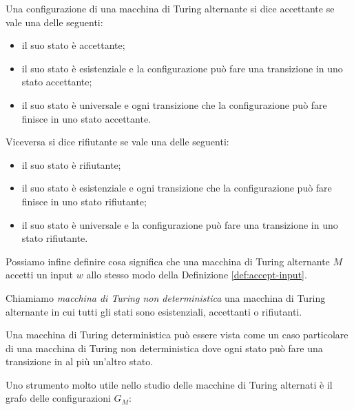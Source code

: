 \begin{definizione}
 Una configurazione di una macchina di Turing alternante si dice accettante se
 vale una delle seguenti:
 \begin{itemize}
  \item il suo stato è accettante;
  \item il suo stato è esistenziale e la configurazione può fare una transizione
  in uno stato accettante;
  \item il suo stato è universale e ogni transizione che la configurazione può fare
  finisce in uno stato accettante.
 \end{itemize}
 Viceversa si dice rifiutante se vale una delle seguenti:
 \begin{itemize}
  \item il suo stato è rifiutante;
  \item il suo stato è esistenziale e ogni transizione che la configurazione può fare
  finisce in uno stato rifiutante;
  \item il suo stato è universale e la configurazione può fare una transizione
  in uno stato rifiutante.
 \end{itemize}
\end{definizione}
Possiamo infine definire cosa significa che una macchina di Turing alternante
$M$ accetti un input $w$ allo stesso modo della Definizione \ref{def:accept-input}.

\begin{definizione}
 Chiamiamo \emph{macchina di Turing non deterministica} una macchina di Turing
 alternante in cui tutti gli stati sono esistenziali, accettanti o rifiutanti.
\end{definizione}

\begin{osservazione}
 Una macchina di Turing deterministica può essere vista come un caso particolare
 di una macchina di Turing non deterministica dove ogni
 stato può fare una transizione in al più un'altro stato.
\end{osservazione}

Uno strumento molto utile nello studio delle macchine di Turing alternati è
il grafo delle configurazioni $G_M$:

